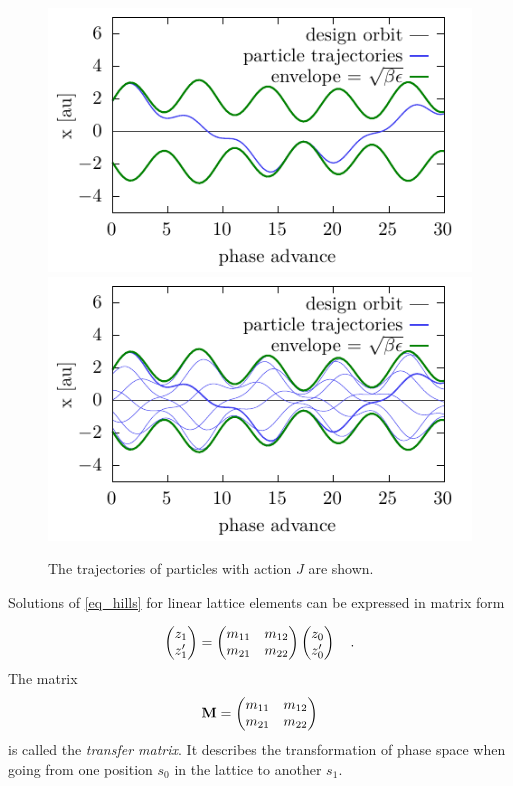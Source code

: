 \begin{figure}[h]
    \centering
    \includegraphics[width=.49\linewidth]{particle_traj_beta_1}
    \hfill
    \includegraphics[width=.49\linewidth]{particle_traj_beta_many_wb} 
    \caption{The trajectories of particles with action $J$ are shown. }
    \label{fig_part_traj}
\end{figure}


Solutions of \eqref{eq_hills} for linear lattice elements can be expressed in matrix form

\begin{equation}
    \begin{pmatrix}
        z_1\\
        z_1'
    \end{pmatrix}
    =
    \begin{pmatrix}
        m_{11} & m_{12} \\
        m_{21} & m_{22}
    \end{pmatrix}
    \begin{pmatrix}
        z_0\\
        z_0'
    \end{pmatrix}
    \quad .
    \label{eq_matrix_element}
\end{equation}
The matrix 
\begin{equation}
    \mathbf{M} = 
    \begin{pmatrix}
        m_{11} & m_{12} \\
        m_{21} & m_{22}
    \end{pmatrix}
    \label{eq_trmat}
\end{equation}
is called the \emph{transfer matrix}. It describes the transformation
of phase space when going from one position $s_0$ in the lattice to another $s_1$.

